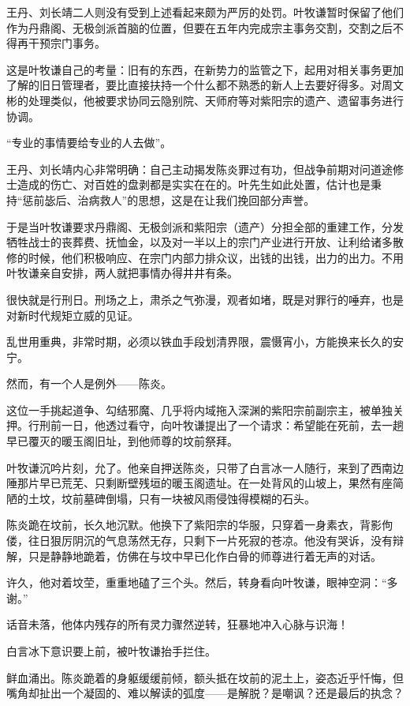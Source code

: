 王丹、刘长靖二人则没有受到上述看起来颇为严厉的处罚。叶牧谦暂时保留了他们作为丹鼎阁、无极剑派首脑的位置，但要在五年内完成宗主事务交割，交割之后不得再干预宗门事务。

这是叶牧谦自己的考量：旧有的东西，在新势力的监管之下，起用对相关事务更加了解的旧日管理者，要比直接扶持一个什么都不熟悉的新人上去要好得多。对周文彬的处理类似，他被要求协同云隐别院、天师府等对紫阳宗的遗产、遗留事务进行协调。

“专业的事情要给专业的人去做”。

王丹、刘长靖内心非常明确：自己主动揭发陈炎罪过有功，但战争前期对问道途修士造成的伤亡、对百姓的盘剥都是实实在在的。叶先生如此处置，估计也是秉持“惩前毖后、治病救人”的思想，这是在让我们挽回部分声誉。

于是当叶牧谦要求丹鼎阁、无极剑派和紫阳宗（遗产）分担全部的重建工作，分发牺牲战士的丧葬费、抚恤金，以及对一半以上的宗门产业进行开放、让利给诸多散修的时候，他们积极响应、在宗门内部力排众议，出钱的出钱，出力的出力。不用叶牧谦亲自安排，两人就把事情办得井井有条。

很快就是行刑日。刑场之上，肃杀之气弥漫，观者如堵，既是对罪行的唾弃，也是对新时代规矩立威的见证。

乱世用重典，非常时期，必须以铁血手段划清界限，震慑宵小，方能换来长久的安宁。

\vspace{2em}

然而，有一个人是例外——陈炎。

这位一手挑起道争、勾结邪魔、几乎将内域拖入深渊的紫阳宗前副宗主，被单独关押。行刑前一日，他透过看守，向叶牧谦提出了一个请求：希望能在死前，去一趟早已覆灭的暖玉阁旧址，到他师尊的坟前祭拜。

叶牧谦沉吟片刻，允了。他亲自押送陈炎，只带了白言冰一人随行，来到了西南边陲那片早已荒芜、只剩断壁残垣的暖玉阁遗址。在一处背风的山坡上，果然有座简陋的土坟，坟前墓碑倒塌，只有一块被风雨侵蚀得模糊的石头。

陈炎跪在坟前，长久地沉默。他换下了紫阳宗的华服，只穿着一身素衣，背影佝偻，往日狠厉阴沉的气息荡然无存，只剩下一片死寂的苍凉。他没有哭诉，没有辩解，只是静静地跪着，仿佛在与坟中早已化作白骨的师尊进行着无声的对话。

许久，他对着坟茔，重重地磕了三个头。然后，转身看向叶牧谦，眼神空洞：“多谢。”

话音未落，他体内残存的所有灵力骤然逆转，狂暴地冲入心脉与识海！

白言冰下意识要上前，被叶牧谦抬手拦住。

鲜血涌出。陈炎跪着的身躯缓缓前倾，额头抵在坟前的泥土上，姿态近乎忏悔，但嘴角却扯出一个凝固的、难以解读的弧度——是解脱？是嘲讽？还是最后的执念？

